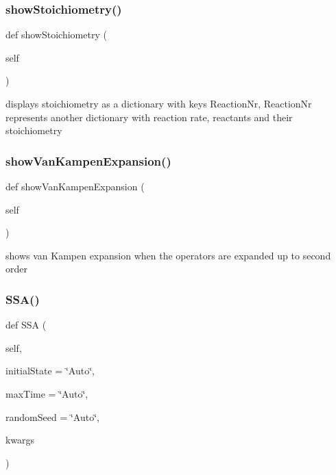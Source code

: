 \subsubsection{\texorpdfstring{show\+Stoichiometry()}{showStoichiometry()}}
{\footnotesize\ttfamily def show\+Stoichiometry (\begin{DoxyParamCaption}\item[{}]{self }\end{DoxyParamCaption})}



displays stoichiometry as a dictionary with keys Reaction\+Nr, Reaction\+Nr represents another dictionary with reaction rate, reactants and their stoichiometry 

\mbox{\label{class_mu_mo_t_1_1_mu_mo_t_1_1_mu_mo_tmodel_a870a1b1e8bba9034173be730dfb6fbbb}} 
\subsubsection{\texorpdfstring{show\+Van\+Kampen\+Expansion()}{showVanKampenExpansion()}}
{\footnotesize\ttfamily def show\+Van\+Kampen\+Expansion (\begin{DoxyParamCaption}\item[{}]{self }\end{DoxyParamCaption})}



shows van Kampen expansion when the operators are expanded up to second order 

\mbox{\label{class_mu_mo_t_1_1_mu_mo_t_1_1_mu_mo_tmodel_ac3c78f7f98887f29a4f0d50dd023c465}} 
\subsubsection{\texorpdfstring{S\+S\+A()}{SSA()}}
{\footnotesize\ttfamily def S\+SA (\begin{DoxyParamCaption}\item[{}]{self,  }\item[{}]{initial\+State = {\ttfamily \char`\"{}Auto\char`\"{}},  }\item[{}]{max\+Time = {\ttfamily \char`\"{}Auto\char`\"{}},  }\item[{}]{random\+Seed = {\ttfamily \char`\"{}Auto\char`\"{}},  }\item[{}]{kwargs }\end{DoxyParamCaption})}

